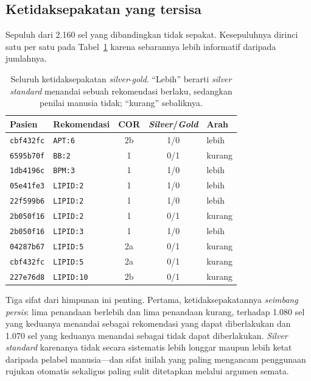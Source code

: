 \subsection{Ketidaksepakatan yang tersisa}
Sepuluh dari 2.160 sel yang dibandingkan tidak sepakat. Kesepuluhnya dirinci satu per satu
pada Tabel~\ref{tab:disagreements} karena sebarannya lebih informatif
daripada jumlahnya.

\begin{table}[h]
\centering
\caption{Seluruh ketidaksepakatan \emph{silver}-\emph{gold}. ``Lebih'' berarti \emph{silver
standard} menandai sebuah rekomendasi berlaku, sedangkan penilai manusia tidak; ``kurang''
sebaliknya.}
\label{tab:disagreements}
\footnotesize
\begin{tabular}{llccl}
\hline
\textbf{Pasien} & \textbf{Rekomendasi} & \textbf{COR} & \textbf{\emph{Silver}/\emph{Gold}}
& \textbf{Arah} \\
\hline
\texttt{cbf432fc} & \texttt{APT:6}    & 2b & 1/0 & lebih  \\
\texttt{6595b70f} & \texttt{BB:2}     & 1  & 0/1 & kurang \\
\texttt{1db4196c} & \texttt{BPM:3}    & 1  & 1/0 & lebih  \\
\texttt{05e41fe3} & \texttt{LIPID:2}  & 1  & 1/0 & lebih  \\
\texttt{22f599b6} & \texttt{LIPID:2}  & 1  & 1/0 & lebih  \\
\texttt{2b050f16} & \texttt{LIPID:2}  & 1  & 0/1 & kurang \\
\texttt{2b050f16} & \texttt{LIPID:3}  & 1  & 1/0 & lebih  \\
\texttt{04287b67} & \texttt{LIPID:5}  & 2a & 0/1 & kurang \\
\texttt{cbf432fc} & \texttt{LIPID:5}  & 2a & 0/1 & kurang \\
\texttt{227e76d8} & \texttt{LIPID:10} & 2b & 0/1 & kurang \\
\hline
\end{tabular}
\end{table}

Tiga sifat dari himpunan ini penting. Pertama, ketidaksepakatannya \emph{seimbang persis}: lima
penandaan berlebih dan lima penandaan kurang, terhadap 1.080 sel yang keduanya menandai sebagai
rekomendasi yang dapat diberlakukan dan 1.070 sel yang keduanya menandai sebagai tidak dapat diberlakukan. \emph{Silver standard} karenanya tidak
secara sistematis lebih longgar maupun lebih ketat daripada pelabel manusia---dan sifat inilah
yang paling mengancam penggunaan rujukan otomatis sekaligus paling sulit ditetapkan melalui
argumen semata.

